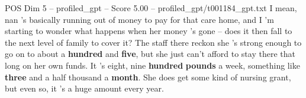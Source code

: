\begin{textsample}{POS Dim 5 – profiled\_gpt – Score 5.00 – profiled\_gpt/t001184\_gpt.txt}  \label{ex:f5_pos_022}
I mean, nan ’s basically running out of money to pay for that care home, and I ’m starting to wonder what happens when her money ’s gone – does it then fall to the next level of family to cover it?
The staff there reckon she ’s strong enough to go on to about a \textbf{hundred} and \textbf{five}, but she just can't afford to stay there that long on her own funds.
It ’s eight, nine \textbf{hundred} \textbf{pounds} a week, something like \textbf{three} and a half thousand a \textbf{month}.
She does get some kind of nursing grant, but even so, it ’s a huge amount every year.

\end{textsample}
